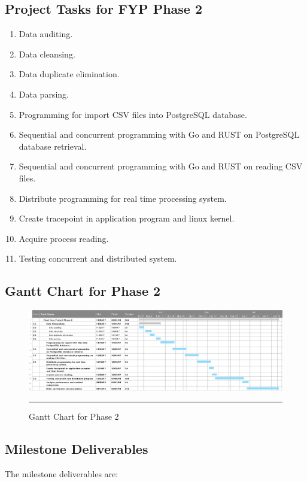 \subsection{Project Tasks for FYP Phase 2}

\begin{enumerate}[topsep=0pt,itemsep=-1ex,partopsep=1ex,parsep=1.5ex]
	\item Data auditing.
	\item Data cleansing. 
	\item Data duplicate elimination.
	\item Data parsing. 
	\item Programming for import CSV files into PostgreSQL database.
	\item Sequential and concurrent programming with Go and RUST on PostgreSQL database retrieval.
	\item Sequential and concurrent programming with Go and RUST on reading CSV files.
	\item Distribute programming for real time processing system.
	\item Create tracepoint in application program and linux kernel.
	\item Acquire process reading.
	\item Testing concurrent and distributed system. 
	
\end{enumerate}

\begin{landscape}
	\subsection{Gantt Chart for Phase 2}
	\begin{figure}[H]
		\centering
		\includegraphics[width=1.5\textwidth]{Figure/Gantt2.png}
		\rule{35em}{0.5pt}
		\caption[Gantt Chart for Phase 2]{Gantt Chart for Phase 2}
	\end{figure}
\end{landscape}


\subsection{Milestone Deliverables}
The milestone deliverables are:

